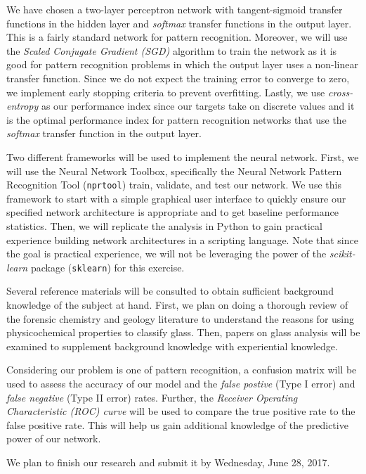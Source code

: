 \documentclass[12pt,halfline,a4paper]{ouparticle}
\begin{document}
We have chosen a two-layer perceptron network with tangent-sigmoid transfer functions in the hidden layer and \emph{softmax} transfer functions in the output layer. This is a fairly standard network for pattern recognition. Moreover, we will use the \emph{Scaled Conjugate Gradient (SGD)} algorithm to train the network as it is good for pattern recognition problems in which the output layer uses a non-linear transfer function. Since we do not expect the training error to converge to zero, we implement early stopping criteria to prevent overfitting. Lastly, we use \emph{cross-entropy} as our performance index since our targets take on discrete values and it is the optimal performance index for pattern recognition networks that use the \emph{softmax} transfer function in the output layer. 

Two different frameworks will be used to implement the neural network. First, we will use the Neural Network Toolbox, specifically the Neural Network Pattern Recognition Tool (\verb|nprtool|) train, validate, and test our network. We use this framework to start with a simple graphical user interface to quickly ensure our specified network architecture is appropriate and to get baseline performance statistics. Then, we will replicate the analysis in Python to gain practical experience building network architectures in a scripting language. Note that since the goal is practical experience, we will not be leveraging the power of the \emph{scikit-learn} package (\verb|sklearn|) for this exercise. 

Several reference materials will be consulted to obtain sufficient background knowledge of the subject at hand. First, we plan on doing a thorough review of the forensic chemistry and geology literature to understand the reasons for using physicochemical properties to classify glass. Then, papers on glass analysis will be examined to supplement background knowledge with experiential knowledge. 

Considering our problem is one of pattern recognition, a confusion matrix will be used to assess the accuracy of our model and the \emph{false postive} (Type I error) and \emph{false negative} (Type II error) rates. Further, the \emph{Receiver Operating Characteristic (ROC) curve} will be used to compare the true positive rate to the false positive rate. This will help us gain additional knowledge of the predictive power of our network. 

We plan to finish our research and submit it by Wednesday, June 28, 2017. 
\end{document}
